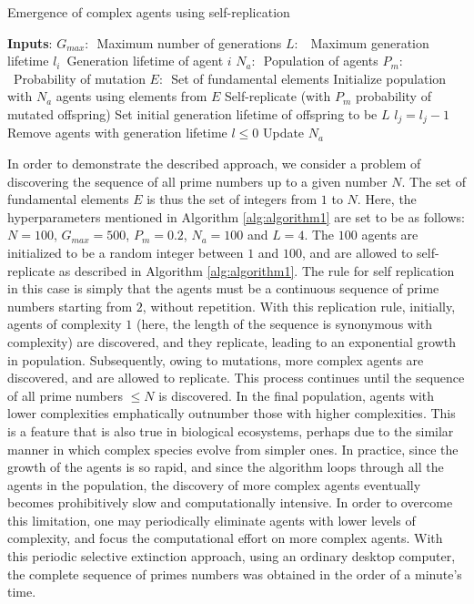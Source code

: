 \begin{algorithm}[h!]
  \caption{Emergence of complex agents using self-replication}
  \begin{algorithmic}[1]
    \STATE \textbf{Inputs}: \STATEx $G_{max}:$~Maximum number of generations \STATEx $L:$~ Maximum generation lifetime
    \STATEx $l_{i}$~Generation lifetime of agent $i$
    \STATEx $N_{a}:$~Population of agents
    \STATEx
    $P_{m}:$~Probability of mutation \STATEx $E:$~Set of fundamental elements
    \STATE Initialize population with $N_{a}$ agents using elements from $E$
    \STATE Self-replicate (with $P_{m}$ probability of mutated offspring)
    \STATE Set initial generation lifetime of offspring to be $L$
    \STATE $l_{j}=l_{j} -1$
    \ENDIF
    \ENDFOR 
    \STATE Remove agents with generation lifetime $l \leq 0$
    \STATE Update $N_{a}$
    \ENDFOR
  \end{algorithmic}
  \label{alg:algorithm1}
\end{algorithm}
In order to demonstrate the described approach, we consider a problem of discovering the sequence of all prime numbers up to a given number $N$. The set of fundamental elements $E$ is thus the set of integers from $1$ to $N$. Here, the hyperparameters mentioned in Algorithm \ref{alg:algorithm1} are set to be as follows: $N=100$, $G_{max}=500$, $P_{m}=0.2$, $N_{a}=100$ and $L=4$. The $100$ agents are initialized to be a random integer between $1$ and $100$, and are allowed to self-replicate as described in Algorithm \ref{alg:algorithm1}. The rule for self replication in this case is simply that the agents must be a continuous sequence of prime numbers starting from $2$, without repetition. With this replication rule, initially, agents of complexity $1$ (here, the length of the sequence is synonymous with complexity) are discovered, and they replicate, leading to an exponential growth in population. Subsequently, owing to mutations, more complex agents are discovered, and are allowed to replicate. This process continues until the sequence of all prime numbers $\leq N$ is discovered. In the final population, agents with lower complexities emphatically outnumber those with higher complexities. This is a feature that is also true in biological ecosystems, perhaps due to the similar manner in which complex species evolve from simpler ones.
In practice, since the growth of the agents is so rapid, and since the algorithm loops through all the agents in the population, the discovery of more complex agents eventually becomes prohibitively slow and computationally intensive. In order to overcome this limitation, one may periodically eliminate agents with lower levels of complexity, and focus the computational effort on more complex agents. With this periodic selective extinction approach, using an ordinary desktop computer, the complete sequence of primes numbers was obtained in the order of a minute's time.
